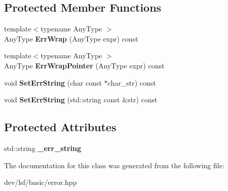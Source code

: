 \subsection*{Protected Member Functions}
\begin{DoxyCompactItemize}
\item 
\hypertarget{classlsf_1_1basic_1_1Error_a10932986050c12255877c402ae6f8ab7}{
{\footnotesize template$<$typename AnyType $>$ }\\AnyType {\bfseries ErrWrap} (AnyType expr) const }
\label{classlsf_1_1basic_1_1Error_a10932986050c12255877c402ae6f8ab7}

\item 
\hypertarget{classlsf_1_1basic_1_1Error_a69306bccfcf7728edfa573e4d173572f}{
{\footnotesize template$<$typename AnyType $>$ }\\AnyType {\bfseries ErrWrapPointer} (AnyType expr) const }
\label{classlsf_1_1basic_1_1Error_a69306bccfcf7728edfa573e4d173572f}

\item 
\hypertarget{classlsf_1_1basic_1_1Error_aaef55d948ef57d8ff530a0e6aa7c3c41}{
void {\bfseries SetErrString} (char const $\ast$char\_\-str) const }
\label{classlsf_1_1basic_1_1Error_aaef55d948ef57d8ff530a0e6aa7c3c41}

\item 
\hypertarget{classlsf_1_1basic_1_1Error_a7af216e3c9ebfa009d7e33f670918a41}{
void {\bfseries SetErrString} (std::string const \&str) const }
\label{classlsf_1_1basic_1_1Error_a7af216e3c9ebfa009d7e33f670918a41}

\end{DoxyCompactItemize}
\subsection*{Protected Attributes}
\begin{DoxyCompactItemize}
\item 
\hypertarget{classlsf_1_1basic_1_1Error_a97da44e3978bc4835cf44ce9ee049149}{
std::string {\bfseries \_\-err\_\-string}}
\label{classlsf_1_1basic_1_1Error_a97da44e3978bc4835cf44ce9ee049149}

\end{DoxyCompactItemize}


The documentation for this class was generated from the following file:\begin{DoxyCompactItemize}
\item 
dev/lsf/basic/error.hpp\end{DoxyCompactItemize}
